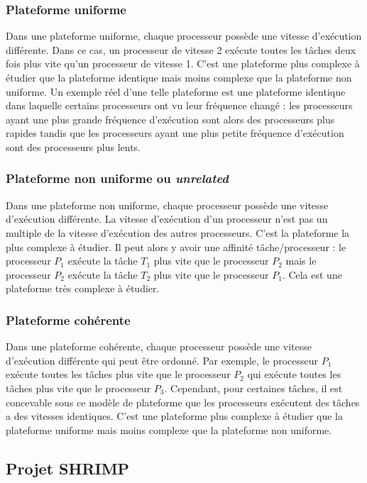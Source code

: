 \subsubsection{Plateforme uniforme}
Dans une plateforme uniforme, chaque processeur possède une vitesse d'exécution différente. Dans ce cas, un processeur de vitesse 2 exécute toutes les tâches deux fois plus vite qu'un processeur de vitesse 1. C'est une plateforme plus complexe à étudier que la plateforme identique mais moins complexe que la plateforme non uniforme. Un exemple réel d'une telle plateforme est une plateforme identique dans laquelle certains processeurs ont vu leur fréquence changé : les processeurs ayant une plus grande fréquence d'exécution sont alors des processeurs plus rapides tandis que les processeurs ayant une plus petite fréquence d'exécution sont des processeurs plus lents. 

\subsubsection{Plateforme non uniforme ou \textit{unrelated}}
Dans une plateforme non uniforme, chaque processeur possède une vitesse d'exécution différente. La vitesse d'exécution d'un processeur n'est pas un multiple de la vitesse d'exécution des autres processeurs. C'est la plateforme la plus complexe à étudier. Il peut alors y avoir une affinité tâche/processeur : le processeur $P_1$ exécute la tâche $T_1$ plus vite que le processeur $P_2$ mais le processeur $P_2$ exécute la tâche $T_2$ plus vite que le processeur $P_1$. Cela est une plateforme très complexe à étudier.

\subsubsection{Plateforme cohérente}
Dans une plateforme cohérente, chaque processeur possède une vitesse d'exécution différente qui peut être ordonné. Par exemple, le processeur $P_1$ exécute toutes les tâches plus vite que le processeur $P_2$ qui exécute toutes les tâches plus vite que le processeur $P_3$. Cependant, pour certaines tâches, il est concevable sous ce modèle de plateforme que les processeurs exécutent des tâches a des vitesses identiques. C'est une plateforme plus complexe à étudier que la plateforme uniforme mais moins complexe que la plateforme non uniforme.

\subsection{Projet SHRIMP}

